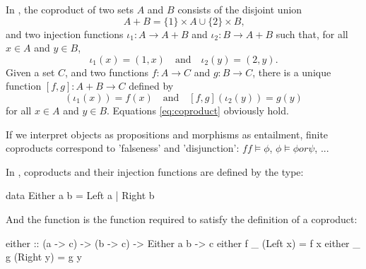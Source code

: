 \begin{example}

  \label{ex:coproduct-set}

  \index{\set}


  In \set, the coproduct of two sets $A$ and $B$ consists of the
  disjoint union \parencite{mathworld-disjoint-union}
  \begin{equation}
    A + B = \{1\} \times A \cup \{2\} \times B
    \text{,}
  \end{equation}
  and two injection functions $\iota_{1}: A \to A + B$ and $\iota_{2}:
  B \to A + B$ such that, for all $x \in A$ and $y \in B$,
  \begin{equation}
    \iota_{1}(x) = (1,x)
    \quad
    \text{and}
    \quad
    \iota_{2}(y) = (2,y)
    \text{.}
  \end{equation}
  Given a set $C$, and two functions $f: A \to C$ and $g: B \to C$,
  there is a unique function $[f,g]: A + B \to C$ defined by
  \begin{equation}
    [f,g](\iota_{1}(x)) = f(x)
    \quad
    \text{and}
    \quad
    [f,g](\iota_{2}(y)) = g(y)
  \end{equation}
  for all $x \in A$ and $y \in B$. Equations \ref{eq:coproduct}
  obviously hold.

\end{example}

\begin{example}

  \label{ex:coproduct-entailment}

  If we interpret objects as propositions and morphisms as entailment,
  finite coproducts correspond to 'falseness' and 'disjunction':
  $ff \models \phi$, $\phi \models \phi or \psi$, ...

\end{example}

\begin{example}
  \label{ex:coproduct-haskell}

  \index{\hask}


  In \hask, coproducts and their injection functions are defined by
  the  type:
  \begin{codehaskell}
data Either a b = Left a | Right b
  \end{codehaskell}
  And the  function is the function required to
  satisfy the definition of a coproduct:
  \begin{codehaskell}
either :: (a -> c) -> (b -> c) -> Either a b -> c
either f _ (Left x)  = f x
either _ g (Right y) = g y
  \end{codehaskell}

\end{example}

